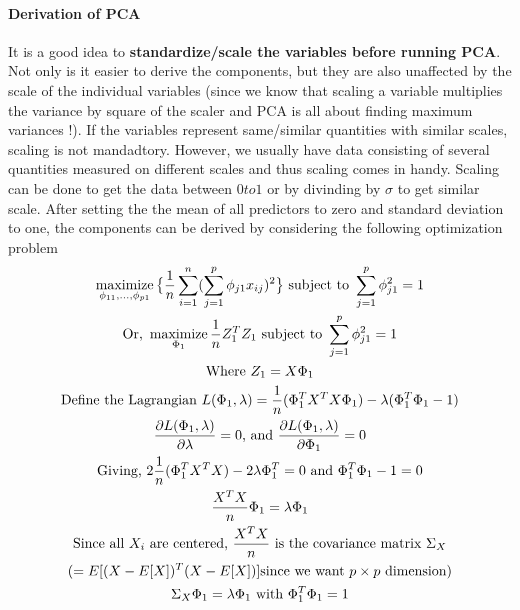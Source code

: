 \documentclass[../statistical_learning_notes.tex]{subfiles}
\begin{document}
    \paragraph{Derivation of PCA}
    It is a good idea to \textbf{standardize/scale the variables before running PCA}. Not only is it easier to derive the components, but they are also unaffected by the scale of the individual variables (since we know that scaling a variable multiplies the variance by square of the scaler and PCA is all about finding maximum variances !). If the variables represent same/similar quantities with similar scales, scaling is not mandadtory. However, we usually have data consisting of several quantities measured on different scales and thus scaling comes in handy. Scaling can be done to get the data between $0 to 1$ or by divinding by $\sigma$ to get similar scale.\newline \newline
    After setting the the mean of all predictors to zero and standard deviation to one, the components can be derived by considering the following optimization problem
    \begin{gather*}
        \operatorname*{maximize}_{\phi_{11},\ldots,\phi_{p1}} \big\{ \frac{1}{n} \sum_{i=1}^{n} (\sum_{j=1}^{p}\phi_{j1}x_{ij})^{2} \big\} \text{ subject to } \sum_{j=1}^{p} \phi_{j1}^{2} = 1\\
        \text{Or, } \operatorname*{maximize}_{\Phi_{1}} \frac{1}{n} Z_{1}^{T}Z_{1} \text{ subject to } \sum_{j=1}^{p} \phi_{j1}^{2} = 1\\
        \text{Where } Z_{1} = X\Phi_{1}\\
        \text{Define the Lagrangian } L(\Phi_{1}, \lambda) = \frac{1}{n} (\Phi_{1}^{T}X^{T}X\Phi_{1}) - \lambda (\Phi_{1}^{T}\Phi_{1} - 1)\\
        \frac{\partial L(\Phi_{1}, \lambda)}{\partial \lambda} = 0 \text{, and } \frac{\partial L(\Phi_{1}, \lambda)}{\partial \Phi_{1}} = 0 \\
        \text{Giving, } 2\frac{1}{n}(\Phi_{1}^{T}X^{T}X) - 2\lambda \Phi_{1}^{T} = 0 \text{ and } \Phi_{1}^{T}\Phi_{1} - 1 = 0\\
        \frac{X^{T}X}{n}\Phi_{1} = \lambda \Phi_{1}\\
        \text{Since all } X_{i} \text{ are centered, } \frac{X^{T}X}{n} \text{ is the covariance matrix } \Sigma_{X}\\
         (=E[(X-E[X])^{T}(X - E[X])] \text{since we want $p\times p$ dimension})\\
        \Sigma_{X} \Phi_{1} = \lambda \Phi_{1} \text{ with } \Phi_{1}^{T}\Phi_{1} = 1\\
    \end{gather*}
\end{document}
